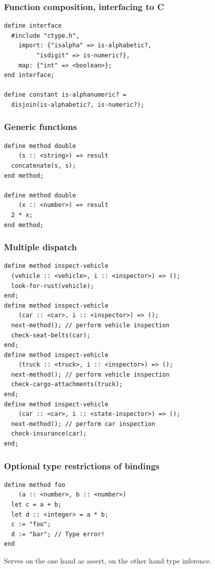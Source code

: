 \documentclass[compress]{beamer}
\begin{document}
\begin{frame}[fragile]
  \frametitle{Function composition, interfacing to C}
  \begin{verbatim}
define interface
  #include "ctype.h",
    import: {"isalpha" => is-alphabetic?,
	     "isdigit" => is-numeric?},
    map: {"int" => <boolean>};
end interface;

define constant is-alphanumeric? =
  disjoin(is-alphabetic?, is-numeric?);
  \end{verbatim}
\end{frame}

\begin{frame}[fragile]
  \frametitle{Generic functions}
  \begin{verbatim}
define method double
    (s :: <string>) => result
  concatenate(s, s);
end method;

define method double
    (x :: <number>) => result
  2 * x;
end method;
  \end{verbatim}
\end{frame}

\begin{frame}[fragile]
  \frametitle{Multiple dispatch}
  \begin{footnotesize}
  \begin{verbatim}
define method inspect-vehicle
  (vehicle :: <vehicle>, i :: <inspector>) => ();
  look-for-rust(vehicle);
end;
define method inspect-vehicle
    (car :: <car>, i :: <inspector>) => ();
  next-method(); // perform vehicle inspection
  check-seat-belts(car);
end;
define method inspect-vehicle
    (truck :: <truck>, i :: <inspector>) => ();
  next-method(); // perform vehicle inspection
  check-cargo-attachments(truck);
end;
define method inspect-vehicle
    (car :: <car>, i :: <state-inspector>) => ();
  next-method(); // perform car inspection
  check-insurance(car);
end;
  \end{verbatim}
  \end{footnotesize}
\end{frame}

\begin{frame}[fragile]
  \frametitle{Optional type restrictions of bindings}
  \begin{verbatim}
define method foo
    (a :: <number>, b :: <number>)
  let c = a + b;
  let d :: <integer> = a * b;
  c := "foo";
  d := "bar"; // Type error!
end
  \end{verbatim}
  Serves on the one hand as assert, on the other hand type inference.
\end{frame}
\end{document}
